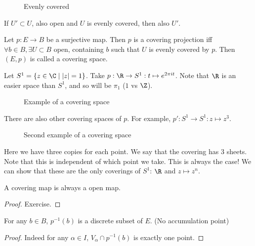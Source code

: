 \begin{figure}[ht]
    \centering
    \caption{Evenly covered}
    \label{fig:evenly-covered}
\end{figure}

\begin{remark}
    If $U' \subset U$, also open and $U$ is evenly covered, then also $U'$.
\end{remark}
\begin{definition}
    Let $p: E \to  B$ be a surjective map.
    Then $p$ is a covering projection iff $\forall b \in B, \exists  U \subset B$ open, containing $b$ such that $U$ is evenly covered by $p$. 
    Then $(E, p)$ is called a covering space.
\end{definition}
\begin{eg}
    Let $S^{1} = \{ z \in \C  \mid  |z| = 1\}$.
    Take $p: \R \to  S^{1}: t \mapsto  e^{2 \pi i t}$.
    Note that $\R$ is an easier space than $S^{1}$, and so will be $\pi_1$ ($1$ vs  $\Z$).
    \begin{figure}[H]
        \centering
        \caption{Example of a covering space}
        \label{fig:covering-space-example}
    \end{figure}
    There are also other covering spaces of $p$.
    For example, $p' : S^{1} \to  S^{1} : z \mapsto z^3$.
    \begin{figure}[H]
        \centering
        \caption{Second example of a covering space}
        \label{fig:covering-space-example-2}
    \end{figure}
    Here we have three copies for each point. We say that the covering has $3$ sheets.
    Note that this is independent of which point we take. This is always the case!
    We can show that these are the only coverings of $S^{1}$: $\R$ and  $z \mapsto  z^{n}$.
\end{eg}

\begin{prop}
    A covering map is always a open map.
\end{prop}
\begin{proof}
    Exercise.
\end{proof}
\begin{prop}
    For any $b \in B$, $p^{-1}(b)$ is a discrete subset of $E$. (No accumulation point)
\end{prop}
\begin{proof}
    Indeed for any $\alpha \in I$, $V_\alpha \cap p^{-1}(b)$ is exactly one point.
\end{proof}

